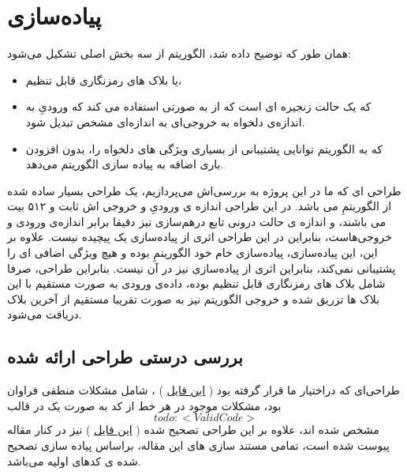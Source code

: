 \pagebreak
\section{
	پیاده‌سازی
}
همان طور که توضیح داده شد، الگوریتم 
از سه بخش اصلی تشکیل می‌شود:
\begin{itemize}
	\item 
	یا بلاک های رمزنگاری قابل تنظیم،
	\item
که یک حالت زنجیره ای است که از
به صورتی استفاده می کند که ورودیِ ‌به اندازه‌ی دلخواه به خروجی‌ای به اندازه‌ای مشخص تبدیل شود.
\item
\textbf{ } 
که به الگوریتم توانایی پشتیبانی از بسیاری ویژگی های دلخواه را، بدون افزودن باری اضافه به پیاده سازی الگوریتم می‌دهد.

\end{itemize}

طراحی ای که ما در این پروژه به بررسی‌اش می‌پردازیم، یک طراحی بسیار ساده شده از الگوریتمِ
می باشد. در این طراحی اندازه ی ورودیِ و خروجی اش ثابت و ۵۱۲ بیت می باشند، و اندازه ی حالت درونی تابع درهم‌سازی نیز دقیقا برابر اندازه‌ی ورودی و خروجی‌هاست، بنابراین در این طراحی اثری از پیاده‌سازی یک 
 پیچیده نیست. علاوه‌ بر این، این پیاده‌سازی، پیاده‌سازی خام خود الگوریتمِ
 بوده و هیچ ویژگی اضافی ای را پشتیبانی نمی‌کند، بنابراین اثری از پیاده‌سازی 
نیز در آن نیست. بنابراین طراحی، صرفا شامل بلاک های رمزنگاری قابل تنظیم بوده، داده‌ی ورودی به صورت مستقیم با این بلاک ها تزریق شده و خروجی الگوریتم نیز به صورت تقریبا مستقیم از آخرین بلاک دریافت می‌شود.

\subsection{
	بررسی درستی طراحی ارائه شده
}
طراحی‌ای که دراختیار ما قرار گرفته بود 
(
\href{https://github.com/VahidZee/SkeinHashingHDL/blob/master/SourceCode/Verilog/skein.v}{این فایل} 
)
، شامل مشکلات منطقی فراوان بود، مشکلات موجود در هر خط از کد 
به صورت یک 
در قالب 
$$todo: <Valid Code>$$
مشخص شده اند، علاوه بر این طراحی تصحیح شده 
(
\href{https://github.com/VahidZee/SkeinHashingHDL/blob/master/SourceCode/Verilog/corrected.v}{این فایل} 
)
نیز در کنار مقاله پیوست شده است، تمامی مستند سازی های این مقاله، براساس پیاده سازی تصحیح شده ی کدهای اولیه می‌باشد.
